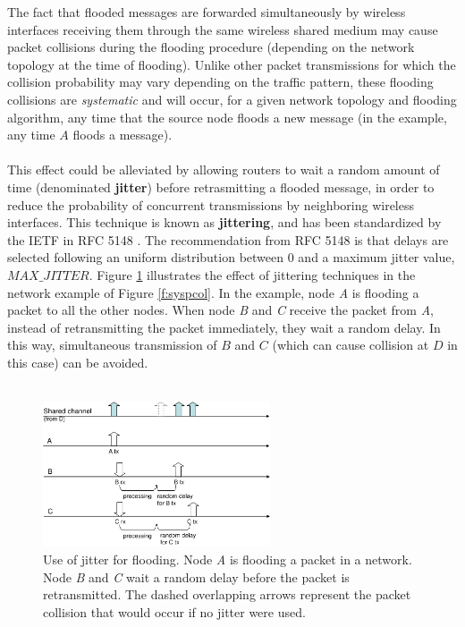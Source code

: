 The fact that flooded messages are forwarded simultaneously by wireless interfaces receiving them through the same wireless shared medium may cause packet collisions during the flooding procedure (depending on the network topology at the time of flooding). Unlike other packet transmissions for which the collision probability may vary depending on the traffic pattern, these flooding collisions are {\em systematic} and will occur, for a given network topology and flooding algorithm, any time that the source node floods a new message (in the example, any time $A$ floods a message). \ \\ \ \\
%
This effect could be alleviated by allowing routers to wait a random amount of time (denominated {\bf jitter}) before retrasmitting a flooded message, in order to reduce the probability of concurrent transmissions by neighboring wireless interfaces. This technique is known as {\bf jittering}, and has been standardized by the IETF in RFC 5148 \cite{jitter-RFC5148}. The recommendation from RFC 5148 is that delays are selected following an uniform distribution between $0$ and a maximum jitter value, $MAX\_JITTER$. Figure \ref{f:jitter} illustrates the effect of jittering techniques in the network example of Figure \ref{f:syspcol}. In the example, node \textit{A} is flooding a packet to all the other nodes. When node \textit{B} and \textit{C} receive the packet from \textit{A}, instead of retransmitting the packet immediately, they wait a random delay. In this way, simultaneous transmission of $B$ and $C$ (which can cause collision at $D$ in this case) can be avoided. \ \\ \ \\
%
\begin{figure}[htb]
\centering
\includegraphics[width=0.6\textwidth]{Figures/jitter4flooding-crop.pdf}
\caption{Use of jitter for flooding. Node \textit{A} is flooding a packet in a network. Node \textit{B} and \textit{C} wait a random delay before the packet is retransmitted. The dashed overlapping arrows represent the packet collision that would occur if no jitter were used.}
\label{f:jitter}
\end{figure}
